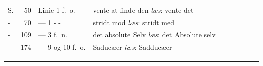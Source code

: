 \documentclass[12pt]{book}
\begin{document}
\noindent
\begin{tabular}{@{}l r l l@{}}
S. & 50  & Linie 1 f.\ o. & vente at finde den \emph{læs}: vente det\\
-  & 70  & --- 1 - -      & stridt mod \emph{læs}: stridt med\\
-  & 109 & --- 3 f.\ n.   & det absolute Selv \emph{læs}: det Absolute selv\\
-  & 174 & --- 9 og 10 f.\ o. & Saducæer \emph{læs}: Sadducæer\\
\end{tabular}

\begin{center}\rule{3cm}{0.4pt}\end{center}
\end{document}
